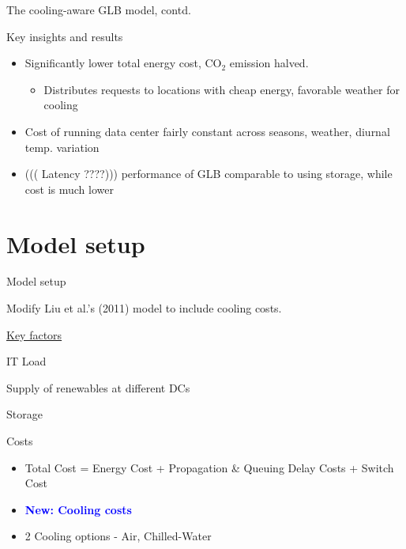 \documentclass[xcolor=dvipsnames]{beamer}
\newcommand{\carbondioxide}{\ensuremath{\mathrm{CO}_2}}
\begin{document}
\begin{frame}{The cooling-aware GLB model, contd.}

	\begin{block}{Key insights and results}
	\begin{itemize}
		\item{Significantly lower total energy cost, \carbondioxide{} emission halved.}  %
		\begin{itemize}
			\item Distributes requests to locations with cheap energy, favorable weather for cooling  %
		\end{itemize}
		\item{Cost of running data center fairly constant across seasons, weather, diurnal temp. variation}  
		\item {((( Latency ????))) performance of GLB comparable to using storage, while cost is much lower}
	\end{itemize}
	\end{block}

\end{frame}

\section{Model setup}

\begin{frame}{Model setup}

Modify Liu et al.'s (2011) %
model to include cooling costs.

\vspace{3mm}
\begin{block}{\underline{Key factors}}
\end{block}
\vspace{-2mm}
	
\begin{block}{IT Load}
\end{block}
\vspace{-2mm}

 \begin{block}{Supply of renewables at different DCs}
\end{block}
\vspace{-2mm}

\begin{block}{Storage}
\end{block}
\vspace{-2mm}

\begin{block}{Costs} 
	\begin{itemize}
		\item Total Cost = Energy Cost + Propagation \& Queuing Delay Costs + Switch Cost
		\item {\bf \textcolor{blue}{New: Cooling costs}}
		\item 2 Cooling options - Air, Chilled-Water 
	\end{itemize}
\end{block}

\end{frame}
\end{document}
